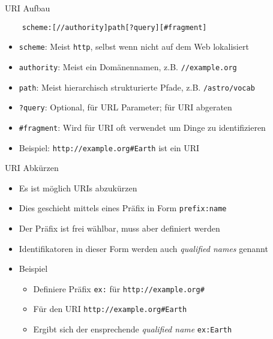 \documentclass{beamer}
\begin{document}
\begin{frame}[fragile]{URI Aufbau}
	
	\begin{lstlisting}
	scheme:[//authority]path[?query][#fragment]
	\end{lstlisting}
	
	\vspace{0.5cm}
	
	\begin{itemize}
		\item \texttt{scheme}: Meist \texttt{http}, selbst wenn nicht auf dem Web lokalisiert
		\item \texttt{authority}: Meist ein Domänennamen, z.B. \texttt{//example.org}
		\item \texttt{path}: Meist hierarchisch strukturierte Pfade, z.B. \texttt{/astro/vocab}
		\item \texttt{?query}: Optional, für URL Parameter; für URI abgeraten
		\item \texttt{\#fragment}: Wird für URI oft verwendet um Dinge zu identifizieren
		\item Beispiel: \texttt{http://example.org\#Earth} ist ein URI
	\end{itemize}
	
\end{frame}

\begin{frame}[fragile]{URI Abkürzen}
	
	\begin{itemize}
		\item Es ist möglich URIs abzukürzen
		\item Dies geschieht mittels eines Präfix in Form \texttt{prefix:name}
		\item Der Präfix ist frei wählbar, muss aber definiert werden
		\item Identifikatoren in dieser Form werden auch \emph{qualified names} genannt
		\item Beispiel
		\begin{itemize}
			\item Definiere Präfix \texttt{ex:} für \texttt{http://example.org\#}
			\item Für den URI \texttt{http://example.org\#Earth}
			\item Ergibt sich der ensprechende \emph{qualified name} \texttt{ex:Earth} 
		\end{itemize}
	\end{itemize}
	
\end{frame}
\end{document}
